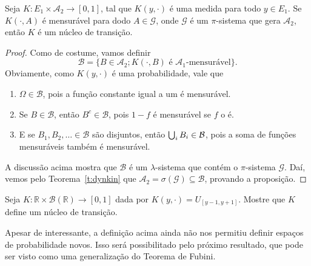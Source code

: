 \begin{proposition}
  \label{p:K_nucleo_na_classe}
  Seja $K:E_1 \times \mathcal{A}_2 \to [0,1]$, tal que $K(y, \cdot)$ é uma medida para todo $y \in E_1$.
  Se $K(\cdot, A)$ é mensurável para dodo $A \in \mathcal{G}$, onde $\mathcal{G}$ é um $\pi$-sistema que gera $\mathcal{A}_2$, então $K$ é um núcleo de transição.
\end{proposition}

\begin{proof}
  Como de costume, vamos definir
  \begin{equation}
    \mathcal{B} = \{B \in \mathcal{A}_2; K(\cdot, B) \text{ é $\mathcal{A}_1$-mensurável}\}.
  \end{equation}
  Obviamente, como $K(y, \cdot)$ é uma probabilidade, vale que
  \begin{enumerate}[\quad a)]
  \item $\Omega \in \mathcal{B}$, pois a função constante igual a um é mensurável.
  \item Se $B \in \mathcal{B}$, então $B^c \in \mathcal{B}$, pois $1 - f$ é mensurável se $f$ o é.
  \item E se $B_1, B_2, \dots \in \mathcal{B}$ são disjuntos, então $\operatorname*{{\textstyle \bigcup}}_i B_i \in \mathcal{B}$, pois a soma de funções mensuráveis também é mensurável.
  \end{enumerate}

  A discussão acima mostra que $\mathcal{B}$ é um $\lambda$-sistema que contém o $\pi$-sistema $\mathcal{G}$.
  Daí, vemos pelo Teorema~\ref{t:dynkin} que $\mathcal{A}_2 = \sigma(\mathcal{G}) \subseteq \mathcal{B}$, provando a proposição.
\end{proof}

\begin{exercise}
  Seja $K:\mathbb{R} \times \mathcal{B}(\mathbb{R}) \to [0,1]$ dada por $K(y, \cdot) = U_{[y - 1,y + 1]}$.
  Mostre que $K$ define um núcleo de transição.
\end{exercise}

Apesar de interessante, a definição acima ainda não nos permitiu definir espaços de probabilidade novos.
Isso será possibilitado pelo próximo resultado, que pode ser visto como uma generalização do Teorema de Fubini.


